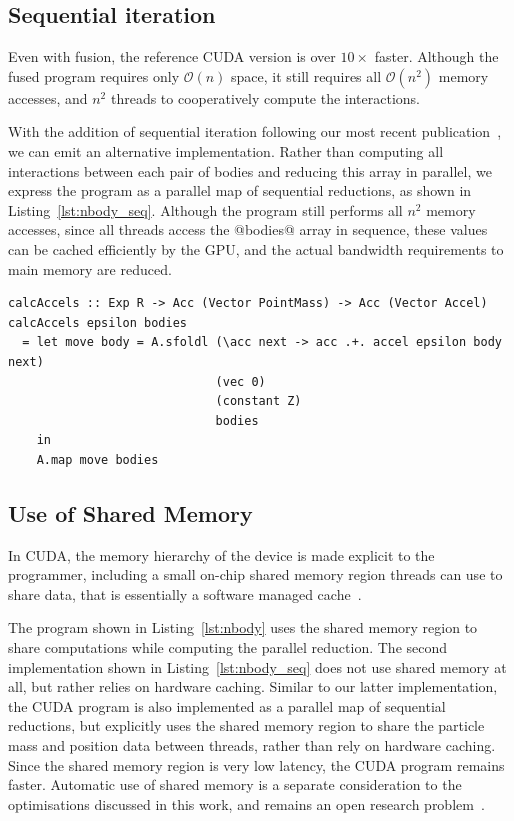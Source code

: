 \subsection{Sequential iteration}

Even with fusion, the reference CUDA version is over $10\times$ faster. Although
the fused program requires only $\mathcal{O}\left( n \right)$ space, it still
requires all $\mathcal{O}\left( n^2 \right)$ memory accesses, and $n^{2}$
threads to cooperatively compute the interactions.

With the addition of sequential iteration following our most recent
publication~\cite{McDonell:2013wi}, we can emit an alternative implementation.
Rather than computing all interactions between each pair of bodies and reducing
this array in parallel, we express the program as a parallel map of sequential
reductions, as shown in Listing~\ref{lst:nbody_seq}. Although the program still
performs all $n^{2}$ memory accesses, since all threads access the @bodies@
array in sequence, these values can be cached efficiently by the GPU, and the
actual bandwidth requirements to main memory are reduced.

\begin{lstlisting}[style=haskell_float
    ,label=lst:nbody_seq
    ,caption={$N$-body gravitational simulation, using sequential reduction}]
calcAccels :: Exp R -> Acc (Vector PointMass) -> Acc (Vector Accel)
calcAccels epsilon bodies
  = let move body = A.sfoldl (\acc next -> acc .+. accel epsilon body next)
                             (vec 0)
                             (constant Z)
                             bodies
    in
    A.map move bodies
\end{lstlisting}


\subsection{Use of Shared Memory}

In CUDA, the memory hierarchy of the device is made explicit to the programmer,
including a small on-chip shared memory region threads can use to share data,
that is essentially a software managed cache~\cite{NVIDIA:2012wf}.

The program shown in Listing~\ref{lst:nbody} uses the shared memory region to
share computations while computing the parallel reduction. The second
implementation shown in Listing~\ref{lst:nbody_seq} does not use shared memory
at all, but rather relies on hardware caching. Similar to our latter
implementation, the CUDA program is also implemented as a parallel map of
sequential reductions, but explicitly uses the shared memory region to share the
particle mass and position data between threads, rather than rely on hardware
caching. Since the shared memory region is very low latency, the CUDA program
remains faster. Automatic use of shared memory is a separate consideration to
the optimisations discussed in this work, and remains an open research
problem~\cite{Ma:2010ft}.

